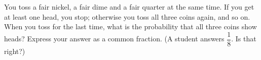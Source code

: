 You toss a fair nickel, a fair dime and a fair quarter at the same time. If you get at least one head, you stop; otherwise you toss all three coins again, and so on. When you toss for the last time, what is the probability that all three coins show heads? Express your answer as a common fraction. (A student answers $\dfrac{1}{8}$. Is that right?)
